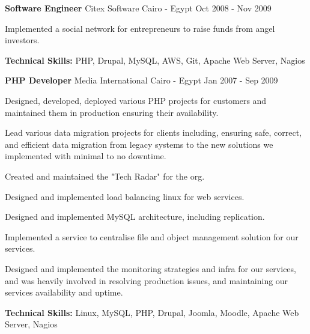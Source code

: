 \begin{cventries}
	\cventry
	{\textbf{Software Engineer}} %
	{Citex Software} %
	{Cairo - Egypt} %
	{Oct 2008 - Nov 2009} %
	{
		\begin{cvitems} %
			\item {Implemented a social network for entrepreneurs to raise funds from angel investors.}
			\item {\textbf{Technical Skills:} PHP, Drupal, MySQL, AWS, Git, Apache Web Server, Nagios}
		\end{cvitems}
	}

	\cventry
	{\textbf{PHP Developer}} %
	{Media International} %
	{Cairo - Egypt} %
	{Jan 2007 - Sep 2009} %
	{
		\begin{cvitems} %
			\item {Designed, developed, deployed various PHP projects for customers and maintained them in production ensuring
			            their availability.}
			\item {Lead various data migration projects for clients including, ensuring safe, correct, and efficient data
			            migration from legacy systems to the new solutions we implemented with minimal to no downtime.}
			\item {Created and maintained the "Tech Radar" for the org.}
			\item {Designed and implemented load balancing linux for web services.}
			\item {Designed and implemented MySQL architecture, including replication.}
			\item {Implemented a service to centralise file and object management solution for our services.}
			\item {Designed and implemented the monitoring strategies and infra for our services, and was heavily involved in
			            resolving production issues, and maintaining our services availability and uptime.}
			\item {\textbf{Technical Skills:} Linux, MySQL, PHP, Drupal, Joomla, Moodle, Apache Web Server, Nagios}
		\end{cvitems}
	}


\end{cventries}
